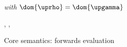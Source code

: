 \begin{figure}
    {\small \flushleft {}\hfill\textit{ with }$\dom{\uprho} = \dom{\upgamma}$%
    \begin{smathpar}
       {
          \upgamma, \uprho, \upalpha
          \closeDefsFwdR
       }
    \end{smathpar}
    }
    \caption{Core semantics: forwards evaluation}
\end{figure}
